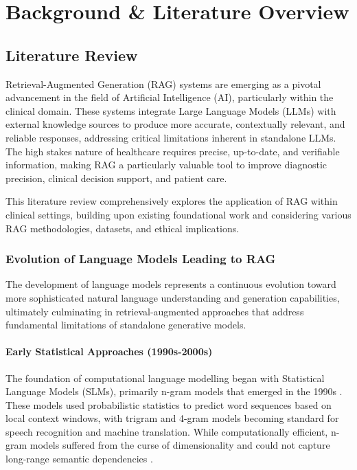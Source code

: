 \chapter{Background \& Literature Overview}
\section{Literature Review}

Retrieval-Augmented Generation (RAG) systems are emerging as a pivotal advancement in the field of Artificial Intelligence (AI), particularly within the clinical domain. These systems integrate Large Language Models (LLMs) with external knowledge sources to produce more accurate, contextually relevant, and reliable responses, addressing critical limitations inherent in standalone LLMs. The high stakes nature of healthcare requires precise, up-to-date, and verifiable information, making RAG a particularly valuable tool to improve diagnostic precision, clinical decision support, and patient care.

This literature review comprehensively explores the application of RAG within clinical settings, building upon existing foundational work and considering various RAG methodologies, datasets, and ethical implications.

\subsection{Evolution of Language Models Leading to RAG}

The development of language models represents a continuous evolution toward more sophisticated natural language understanding and generation capabilities, ultimately culminating in retrieval-augmented approaches that address fundamental limitations of standalone generative models.

\subsubsection{Early Statistical Approaches (1990s-2000s)}
The foundation of computational language modelling began with Statistical Language Models (SLMs), primarily n-gram models that emerged in the 1990s \citep{kneser1995improved}. These models used probabilistic statistics to predict word sequences based on local context windows, with trigram and 4-gram models becoming standard for speech recognition and machine translation. While computationally efficient, n-gram models suffered from the curse of dimensionality and could not capture long-range semantic dependencies \citep{bengio2003neural}.

